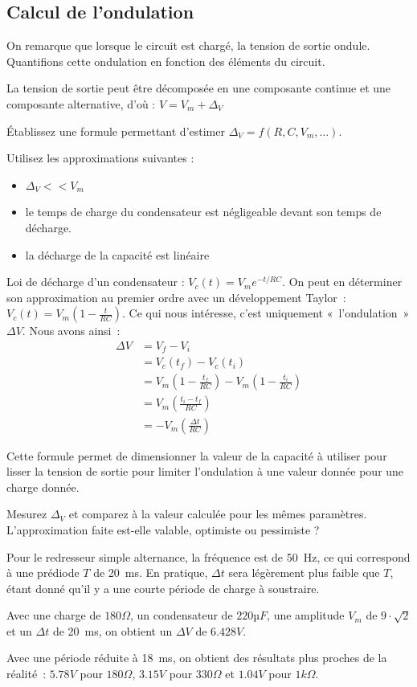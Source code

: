 \documentclass{../template/labo}
\begin{document}
\subsection{Calcul de l'ondulation}
On remarque que lorsque le circuit est chargé, la tension de sortie ondule. Quantifions cette ondulation en fonction des éléments du circuit.

La tension de sortie peut être décomposée en une composante continue et une composante alternative, d'où : $V=V_m+\Delta_V$

\Question
{
	Établissez une formule permettant d'estimer $\Delta_V=f(R,C, V_m,\dots)$. %
	
	Utilisez les approximations suivantes :
	\begin{itemize}
	\item $\Delta_V<<V_m$
	\item le temps de charge du condensateur est négligeable devant son temps de décharge.
	\item la décharge de la capacité est linéaire
	\end{itemize}
}
{
Loi de décharge d'un condensateur : $V_c(t) = V_m e^{-t/RC}$. On peut en déterminer son approximation au premier ordre avec un développement Taylor~: $V_c(t) = V_m (1-\frac{t}{RC})$.
Ce qui nous intéresse, c'est uniquement «~l'ondulation~» $\Delta V$.
Nous avons ainsi~: 
\begin{align*}
\Delta V & = V_f - V_i \\
& = V_c(t_f) - V_c(t_i) \\
& = V_m (1-\frac{t_f}{RC}) - V_m (1 - \frac{t_i}{RC})\\
& = V_m (\frac{t_i - t_f}{RC}) \\
& = - V_m (\frac{\Delta t}{RC})
\end{align*}
}%
	\label{Q:14}


Cette formule permet de dimensionner la valeur de la capacité à utiliser pour lisser la tension de sortie pour limiter l'ondulation à une valeur donnée pour une charge donnée.

\Question
{
	Mesurez $\Delta_V$ et comparez à la valeur calculée pour les mêmes paramètres. L'approximation faite est-elle valable, optimiste ou pessimiste ?
}
{
Pour le redresseur simple alternance, la fréquence est de 50~Hz, ce qui correspond à une prédiode $T$ de 20~ms.
En pratique, $\Delta t$ sera légèrement plus faible que $T$, étant donné qu'il y a une courte période de charge à soustraire.

Avec une charge de $180 \Omega$, un condensateur de $220 µF$, une amplitude $V_m$ de $9\cdot\sqrt{2}$ et un $\Delta t$ de 20~ms, on obtient un $\Delta V$ de $6.428 V$.

Avec une période réduite à 18~ms, on obtient des résultats plus proches de la réalité~: $5.78 V$ pour $180 \Omega$, $3.15 V$ pour $330 \Omega$ et $1.04 V$ pour $1 k\Omega$.

}%
	\label{Q:15}
\end{document}
